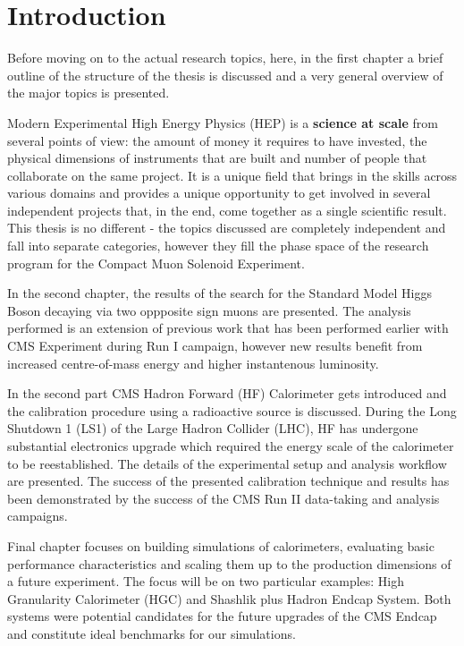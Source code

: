 \chapter{Introduction} \label{chapter:introduction}
Before moving on to the actual research topics, here, in the first chapter a brief outline of the structure of the thesis is discussed and a very general overview of the major topics is presented.

Modern Experimental High Energy Physics (HEP) is a \textbf{science at scale} from several points of view: the amount of money it requires to have invested, the physical dimensions of instruments that are built and number of people that collaborate on the same project. It is a unique field that brings in the skills across various domains and provides a unique opportunity to get involved in several independent projects that, in the end, come together as a single scientific result. This thesis is no different - the topics discussed are completely independent and fall into separate categories, however they fill the phase space of the research program for the Compact Muon Solenoid Experiment.

In the second chapter, the results of the search for the Standard Model Higgs Boson decaying via two oppposite sign muons are presented. The analysis performed is an extension of previous work that has been performed earlier with CMS Experiment during Run I campaign, however new results benefit from increased centre-of-mass energy and higher instantenous luminosity.

In the second part CMS Hadron Forward (HF) Calorimeter gets introduced and the calibration procedure using a radioactive source is discussed. During the Long Shutdown 1 (LS1) of the Large Hadron Collider (LHC), HF has undergone substantial electronics upgrade which required the energy scale of the calorimeter to be reestablished. The details of the experimental setup and analysis workflow are presented. The success of the presented calibration technique and results has been demonstrated by the success of the CMS Run II data-taking and analysis campaigns.

Final chapter focuses on building simulations of calorimeters, evaluating basic performance characteristics and scaling them up to the production dimensions of a future experiment. The focus will be on two particular examples: High Granularity Calorimeter (HGC) and Shashlik plus Hadron Endcap System. Both systems were potential candidates for the future upgrades of the CMS Endcap and constitute ideal benchmarks for our simulations.


